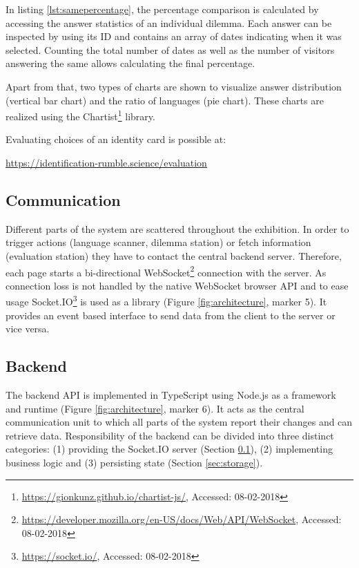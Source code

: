 In listing \ref{lst:samepercentage}, the percentage comparison is calculated by accessing the answer statistics of an individual dilemma.
Each answer can be inspected by using its ID and contains an array of dates indicating when it was selected.
Counting the total number of dates as well as the number of visitors answering the same allows calculating the final percentage.

Apart from that, two types of charts are shown to visualize answer distribution (vertical bar chart) and the ratio of languages (pie chart).
These charts are realized using the Chartist\footnote{\url{https://gionkunz.github.io/chartist-js/}, Accessed: 08-02-2018} library.

Evaluating choices of an identity card is possible at:

\begin{flushleft}
  \url{https://identification-rumble.science/evaluation}
\end{flushleft}


\subsection{Communication} \label{sec:communication}
Different parts of the system are scattered throughout the exhibition.
In order to trigger actions (language scanner, dilemma station) or fetch information (evaluation station) they have to contact the central backend server.
Therefore, each page starts a bi-directional WebSocket\footnote{\url{https://developer.mozilla.org/en-US/docs/Web/API/WebSocket}, Accessed: 08-02-2018} connection with the server.
As connection loss is not handled by the native WebSocket browser API and to ease usage Socket.IO\footnote{\url{https://socket.io/}, Accessed: 08-02-2018} is used as a library (Figure \ref{fig:architecture}, marker 5).
It provides an event based interface to send data from the client to the server or vice versa.


\subsection{Backend} \label{sec:backend}
The backend API is implemented in TypeScript using Node.js as a framework and runtime (Figure \ref{fig:architecture}, marker 6).
It acts as the central communication unit to which all parts of the system report their changes and can retrieve data.
Responsibility of the backend can be divided into three distinct categories: (1) providing the Socket.IO server (Section \ref{sec:communication}), (2) implementing business logic and (3) persisting state (Section \ref{sec:storage}).

